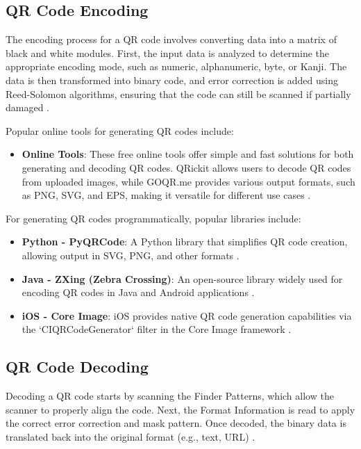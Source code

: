\subsection{QR Code Encoding}  
The encoding process for a QR code involves converting data into a matrix of black and white modules. First, the input data is analyzed to determine the appropriate encoding mode, such as numeric, alphanumeric, byte, or Kanji. The data is then transformed into binary code, and error correction is added using Reed-Solomon algorithms, ensuring that the code can still be scanned if partially damaged \cite{Tiwari2016}.

Popular online tools for generating QR codes include:
\begin{itemize}
	\item \textbf{Online Tools}: These free online tools offer simple and fast solutions for both generating and decoding QR codes. QRickit allows users to decode QR codes from uploaded images, while GOQR.me provides various output formats, such as PNG, SVG, and EPS, making it versatile for different use cases \cite{QRCodeMonkey2024}\cite{QRTiger2024}.
	
	
\end{itemize}

For generating QR codes programmatically, popular libraries include:
\begin{itemize}
	\item \textbf{Python - PyQRCode}: A Python library that simplifies QR code creation, allowing output in SVG, PNG, and other formats \cite{PyQRCode2024}.
	\item \textbf{Java - ZXing (Zebra Crossing)}: An open-source library widely used for encoding QR codes in Java and Android applications \cite{ZXing2024}.
	\item \textbf{iOS - Core Image}: iOS provides native QR code generation capabilities via the `CIQRCodeGenerator` filter in the Core Image framework \cite{CoreImage2024}.
\end{itemize}

\subsection{QR Code Decoding}  
Decoding a QR code starts by scanning the Finder Patterns, which allow the scanner to properly align the code. Next, the Format Information is read to apply the correct error correction and mask pattern. Once decoded, the binary data is translated back into the original format (e.g., text, URL) \cite{Tiwari2016}.

